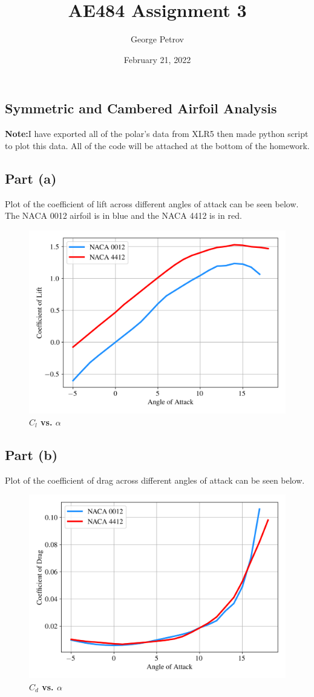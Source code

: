 

\title{AE484 Assignment 3}
\author{George Petrov}
\date{February 21, 2022}



\maketitle
\begin{singlespace}
\section{Symmetric and Cambered Airfoil Analysis}
\textbf{Note:}I have exported all of the polar's data from XLR5 then made python script to plot this data. All of the code will be attached at the bottom of the homework.
\subsection{Part (a)}
Plot of the coefficient of lift across different angles of attack can be seen below. The NACA 0012 airfoil is in blue and the NACA 4412 is in red.
\begin{figure}[H]
        \centering
        \includegraphics[width=.7\textwidth]{homeworks/homework3/george/plots/problem1_a.png}
        \caption{\textbf{$C_l$ vs. $\alpha$}}
        \label{fig:1a}
\end{figure}
\subsection{Part (b)}
Plot of the coefficient of drag across different angles of attack can be seen below.
\begin{figure}[H]
        \centering
        \includegraphics[width=.7\textwidth]{homeworks/homework3/george/plots/problem1_b.png}
        \caption{\textbf{$C_d$ vs. $\alpha$}}
        \label{fig:1b}
\end{figure}

\end{singlespace}
